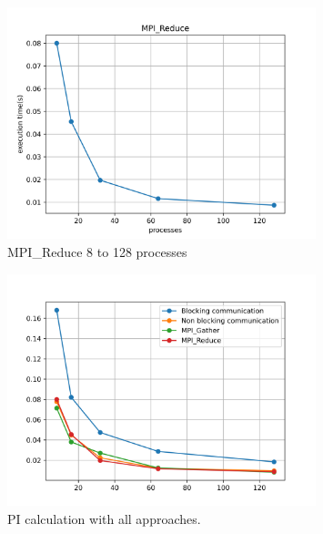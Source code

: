 \documentclass[12pt]{article}
\begin{document}
\begin{figure}[H]
  \centering
  \includegraphics[width=0.8\textwidth]{graph-pi-mpi-reduce.png}
  \caption{MPI\_Reduce 8 to 128 processes}
  \label{fig:blocking}
\end{figure}


\begin{figure}[H]
  \centering
  \includegraphics[width=0.8\textwidth]{all.png}
  \caption{PI calculation with all approaches.}
  \label{fig:blocking}
\end{figure}
\end{document}
